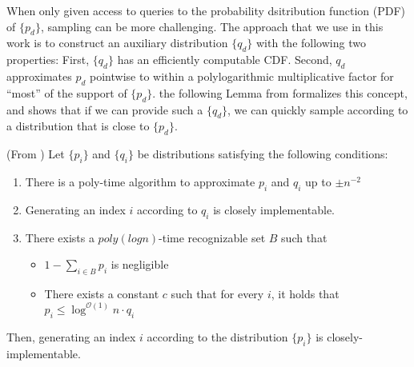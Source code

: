 When only given access to queries to the probability dsitribution function (PDF) of $\{p_d\}$, sampling can be more challenging.
The approach that we use in this work is to construct an auxiliary distribution $\{q_d\}$ with the following two properties:
First, $\{ q_d\}$ has an efficiently computable CDF.
Second, $q_d$ approximates $p_d$ pointwise to within a polylogarithmic multiplicative factor for ``most'' of the support of $\{ p_d\}$.
the following Lemma from \cite{huge} formalizes this concept, and shows that if we can provide such a $\{ q_d\}$,
we can quickly sample according to a distribution that is close to $\{ p_d\}$.
\begin{lemma}
\label{lem:rejection_sampling} (From \cite{huge})
Let $\{p_i\}$ and $\{q_i\}$ be distributions satisfying the following conditions:
\begin{enumerate}
    \item There is a poly-time algorithm to approximate $p_i$ and $q_i$ up to $\pm n^{-2}$
    \item Generating an index $i$ according to $q_i$ is closely implementable.
    \item There exists a $poly(log n)$-time recognizable set $B$ such that
    \begin{itemize}
        \item $1-\sum\limits_{i\in B} p_i$ is negligible
        \item There exists a constant $c$ such that for every $i$, it holds that $p_i\le \log^{\mathcal{O}(1)} n\cdot q_i$
    \end{itemize}
\end{enumerate}
Then, generating an index $i$ according to the distribution $\{p_i\}$ is closely-implementable.
\end{lemma}






